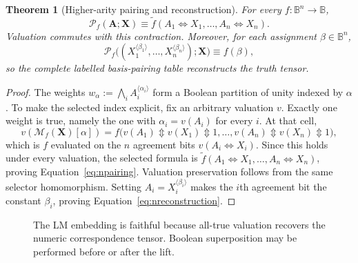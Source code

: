 \documentclass[11pt]{article}
\newtheorem{theorem}{Theorem}[section]
\theoremstyle{definition}
\theoremstyle{remark}
\newcommand{\B}{\mathbb B}
\newcommand{\cC}{\mathcal C}
\newcommand{\cM}{\mathcal M}
\newcommand{\cP}{\mathcal P}
\newcommand{\xor}{\mathbin{\Updownarrow}}
\begin{document}
\begin{theorem}[Higher-arity pairing and reconstruction]
For every $f:\B^n\to\B$,
\begin{equation}
 \cP_f(\mathbf A;\mathbf X)
 \equiv
 \widetilde f(A_1\Leftrightarrow X_1,\ldots,A_n\Leftrightarrow X_n).
 \label{eq:npairing}
\end{equation}
Valuation commutes with this contraction.  Moreover, for each assignment $\beta\in\B^n$,
\begin{equation}
 \cP_f\bigl((X_1^{\langle\beta_1\rangle},\ldots,X_n^{\langle\beta_n\rangle});\mathbf X\bigr)
 \equiv f(\beta),
 \label{eq:nreconstruction}
\end{equation}
so the complete labelled basis-pairing table reconstructs the truth tensor.
\end{theorem}
\begin{proof}
The weights $w_\alpha:=\bigwedge_i A_i^{\langle\alpha_i\rangle}$ form a Boolean partition of unity indexed by $\alpha$.  To make the selected index explicit, fix an arbitrary valuation $v$.  Exactly one weight is true, namely the one with $\alpha_i=v(A_i)$ for every $i$.  At that cell,
\[
 v\!\left(\cM_f(\mathbf X)[\alpha]\right)
 =f\bigl(v(A_1)\xor v(X_1)\xor1,\ldots,
         v(A_n)\xor v(X_n)\xor1\bigr),
\]
which is $f$ evaluated on the $n$ agreement bits $v(A_i\Leftrightarrow X_i)$.  Since this holds under every valuation, the selected formula is
$\widetilde f(A_1\Leftrightarrow X_1,\ldots,A_n\Leftrightarrow X_n)$, proving Equation~\eqref{eq:npairing}.  Valuation preservation follows from the same selector homomorphism.  Setting $A_i=X_i^{\langle\beta_i\rangle}$ makes the $i$th agreement bit the constant $\beta_i$, proving Equation~\eqref{eq:nreconstruction}.
\end{proof}

\begin{figure}[ht]
\centering
{}
\caption{The LM embedding is faithful because all-true valuation recovers the numeric correspondence tensor.  Boolean superposition may be performed before or after the lift.}
\label{fig:embedding}
\end{figure}
\end{document}
